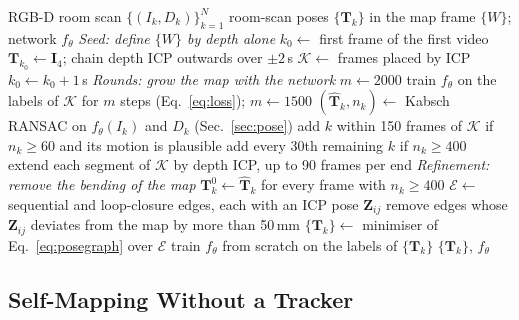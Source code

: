 \documentclass[9pt,shortpaper,twoside,web]{ieeecolor2}
\begin{document}
\begin{algorithm}[t]
  \caption{Self-mapping of a room scan}
  \label{alg:mapping}
  \small
  \begin{algorithmic}[1]
    \Require RGB-D room scan $\{(I_k,D_k)\}_{k=1}^{N}$
    \Ensure room-scan poses $\{\mathbf{T}_k\}$ in the map frame $\{W\}$; network $f_\theta$
    \Statex \textit{Seed: define $\{W\}$ by depth alone}
    \State $k_0\gets$ first frame of the first video
    \Repeat
      \State $\mathbf{T}_{k_0}\gets\mathbf{I}_4$; chain depth ICP outwards over $\pm2$\,s
      \State $\mathcal{K}\gets$ frames placed by ICP
       $k_0\gets k_0+1$\,s \EndIf
    \Statex \textit{Rounds: grow the map with the network}
    \State $m\gets2000$
    \Repeat
      \State train $f_\theta$ on the labels of $\mathcal{K}$ for $m$ steps (Eq.~\eqref{eq:loss}); $m\gets1500$
        \State $(\hat{\mathbf{T}}_k,n_k)\gets$ Kabsch RANSAC on $f_\theta(I_k)$ and $D_k$ (Sec.~\ref{sec:pose})
      \EndFor
      \State add $k$ within 150 frames of $\mathcal{K}$ if $n_k\ge60$ and its motion is plausible
      \State add every 30th remaining $k$ if $n_k\ge400$ 
      \State extend each segment of $\mathcal{K}$ by depth ICP, up to 90 frames per end
    \Statex \textit{Refinement: remove the bending of the map}
    \State $\mathbf{T}^0_k\gets\hat{\mathbf{T}}_k$ for every frame with $n_k\ge400$
    \State $\mathcal{E}\gets$ sequential and loop-closure edges, each with an ICP pose $\mathbf{Z}_{ij}$
    \State remove edges whose $\mathbf{Z}_{ij}$ deviates from the map by more than 50\,mm
    \State $\{\mathbf{T}_k\}\gets$ minimiser of Eq.~\eqref{eq:posegraph} over $\mathcal{E}$
    \State train $f_\theta$ from scratch on the labels of $\{\mathbf{T}_k\}$
    \State \Return $\{\mathbf{T}_k\}$, $f_\theta$
  \end{algorithmic}
\end{algorithm}

\subsection{Self-Mapping Without a Tracker}
\label{sec:mapping}
\end{document}
